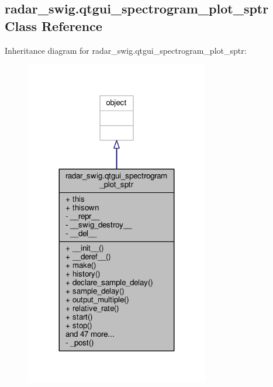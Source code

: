 \subsection{radar\+\_\+swig.\+qtgui\+\_\+spectrogram\+\_\+plot\+\_\+sptr Class Reference}
\label{classradar__swig_1_1qtgui__spectrogram__plot__sptr}


Inheritance diagram for radar\+\_\+swig.\+qtgui\+\_\+spectrogram\+\_\+plot\+\_\+sptr\+:
\nopagebreak
\begin{figure}[H]
\begin{center}
\leavevmode
\includegraphics[width=227pt]{d0/d90/classradar__swig_1_1qtgui__spectrogram__plot__sptr__inherit__graph}
\end{center}
\end{figure}


